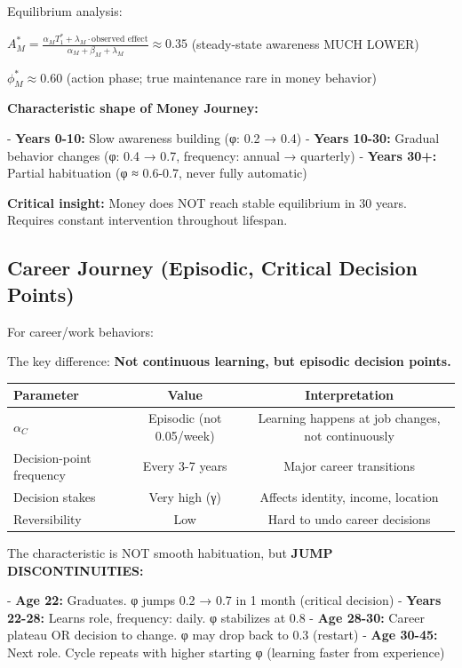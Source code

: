 Equilibrium analysis:

$A^*_M = \frac{\alpha_M T_1^* + \lambda_M \cdot \text{observed effect}}{\alpha_M + \beta_M + \lambda_M} \approx 0.35$ (steady-state awareness MUCH LOWER)

$\phi^*_M \approx 0.60$ (action phase; true maintenance rare in money behavior)

\textbf{Characteristic shape of Money Journey:}

- \textbf{Years 0-10:} Slow awareness building (φ: 0.2 → 0.4)
- \textbf{Years 10-30:} Gradual behavior changes (φ: 0.4 → 0.7, frequency: annual → quarterly)
- \textbf{Years 30+:} Partial habituation (φ ≈ 0.6-0.7, never fully automatic)

\textbf{Critical insight:} Money does NOT reach stable equilibrium in 30 years. Requires constant intervention throughout lifespan.

\subsection{Career Journey (Episodic, Critical Decision Points)}

For career/work behaviors:

The key difference: \textbf{Not continuous learning, but episodic decision points.}

\begin{center}
\begin{tabular}{@{}lcc@{}}
\toprule
\textbf{Parameter} & \textbf{Value} & \textbf{Interpretation} \\
\midrule
$\alpha_C$ & Episodic (not 0.05/week) & Learning happens at job changes, not continuously \\
Decision-point frequency & Every 3-7 years & Major career transitions \\
Decision stakes & Very high (γ) & Affects identity, income, location \\
Reversibility & Low & Hard to undo career decisions \\
\midrule
\end{tabular}
\end{center}

The characteristic is NOT smooth habituation, but \textbf{JUMP DISCONTINUITIES:}

- \textbf{Age 22:} Graduates. φ jumps 0.2 → 0.7 in 1 month (critical decision)
- \textbf{Years 22-28:} Learns role, frequency: daily. φ stabilizes at 0.8
- \textbf{Age 28-30:} Career plateau OR decision to change. φ may drop back to 0.3 (restart)
- \textbf{Age 30-45:} Next role. Cycle repeats with higher starting φ (learning faster from experience)

